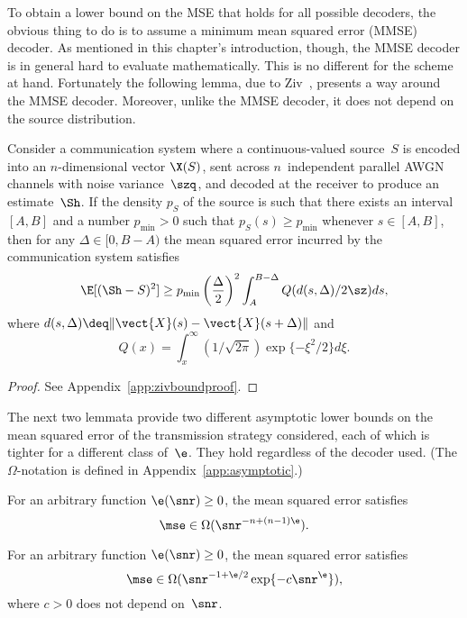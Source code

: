 To obtain a lower bound on the MSE that holds for all possible decoders, the
obvious thing to do is to assume a minimum mean squared error (MMSE) decoder. As
mentioned in this chapter's introduction, though, the MMSE decoder is in general
hard to evaluate mathematically. This is no different for the scheme at hand.
Fortunately the following lemma, due to Ziv~\cite{Ziv1970}, presents a way
around the MMSE decoder. Moreover, unlike the MMSE decoder, it does not depend
on the source distribution.


\begin{lemma}
  \label{lem:zivbound}
  Consider a communication system where a con\-tin\-u\-ous-valued source~$S$ is
  encoded into an $n$-dimensional vector $\X(S)$, sent across $n$~independent
  parallel AWGN channels with noise variance~$\szq$, and decoded at the receiver
  to produce an estimate~$\Sh$.  If the density $p_S$ of the source is such that
  there exists an interval $[A,B]$ and a number $p_{\min} > 0$ such that $p_S(s)
  \ge p_{\min}$ whenever $s \in [A,B]$, then for any $\Delta \in [0,B-A)$ the
  mean squared error incurred by the communication system satisfies
  \begin{equation}
    \label{eq:zivbound}
    \E[(\Sh - S)^2] \ge p_{\min} \left(\frac{\Delta}{2} \right)^2 
    \int_A^{B-\Delta} Q(d(s, \Delta) / 2 \sz) ds,
  \end{equation}
  where $d(s, \Delta) \deq \|\vect{X}(s) - \vect{X}(s+\Delta)\|$ and 
  \[Q(x) = \int_x^{\infty} (1/\sqrt{2\pi}) \exp\{-\xi^2/2\} d\xi.\]
\end{lemma}

\begin{proof}
  See Appendix~\ref{app:zivboundproof}.
\end{proof}

The next two lemmata provide two different asymptotic lower bounds on the
mean squared error of the transmission strategy considered, each of which is
tighter for a different class of~$\e$. They hold regardless of the decoder used.
(The $\Omega$-notation is defined in Appendix~\ref{app:asymptotic}.)

\begin{lemma}
  \label{lem:lowerbound1}
  For an arbitrary function $\e(\snr) \ge 0$, the mean squared error satisfies
  \begin{equation*}
    \mse \in \Omega(\snr^{-n + (n-1)\e}).
  \end{equation*}
\end{lemma}

\begin{lemma}
  \label{lem:lowerbound2}
  For an arbitrary function $\e(\snr) \ge 0$, the mean squared error
  satisfies
  \begin{equation*}
    \mse \in \Omega(\snr^{-1+\e/2} \exp\{-c\snr^\e\}),
  \end{equation*}
  where $c>0$ does not depend on~$\snr$.
\end{lemma}

